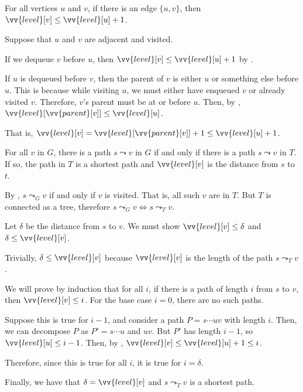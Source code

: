 \begin{claim}\label{claim:bfs:edge-level}
  For all vertices $u$ and $v$, if there is an edge $\{u,v\}$,
  then $\vv{level}[v] \leq \vv{level}[u] + 1$.
\end{claim}
\begin{prf}
  Suppose that $u$ and $v$ are adjacent and visited.

  If we dequeue $v$ before $u$, then $\vv{level}[v] \leq \vv{level}[u] + 1$
  by .

  If $u$ is dequeued before $v$, then the parent of $v$ is
  either $u$ or something else before $u$.
  This is because while visiting $u$, we must either have enqueued $v$
  or already visited $v$.
  Therefore, $v$'s parent must be at or before $u$.
  Then, by ,
  $\vv{level}[\vv{parent}[v]] \leq \vv{level}[u]$.

  That is, $\vv{level}[v] = \vv{level}[\vv{parent}[v]] + 1 \leq \vv{level}[u] + 1$.
\end{prf}

\begin{lemma}
  For all $v$ in $G$,
  there is a path $s \leadsto v$ in $G$ if and only if
  there is a path $s \leadsto v$ in $T$.
  If so, the path in $T$ is a shortest path and $\vv{level}[v]$ is the distance from $s$ to $t$.
\end{lemma}
\begin{prf}
  By , $s \leadsto_G v$ if and only if $v$ is visited.
  That is, all such $v$ are in $T$.
  But $T$ is connected as a tree, therefore $s \leadsto_G v \iff s \leadsto_T v$.

  Let $\delta$ be the distance from $s$ to $v$.
  We must show $\vv{level}[v] \leq \delta$ and $\delta \leq \vv{level}[v]$.

  Trivially, $\delta \leq \vv{level}[v]$ because $\vv{level}[v]$
  is the length of the path $s \leadsto_T v$.

  We will prove by induction that for all $i$,
  if there is a path of length $i$ from $s$ to $v$,
  then $\vv{level}[v] \leq i$.
  For the base case $i=0$, there are no such paths.

  Suppose this is true for $i-1$, and consider a path $P = s\dotsb uv$ with length $i$.
  Then, we can decompose $P$ as $P' = s\dotsb u$ and $uv$.
  But $P'$ has length $i-1$, so $\vv{level}[u] \leq i-1$.
  Then, by , $\vv{level}[v] \leq \vv{level}[u] + 1 \leq i$.

  Therefore, since this is true for all $i$, it is true for $i=\delta$.

  Finally, we have that $\delta = \vv{level}[v]$ and $s \leadsto_T v$ is a shortest path.
\end{prf}

